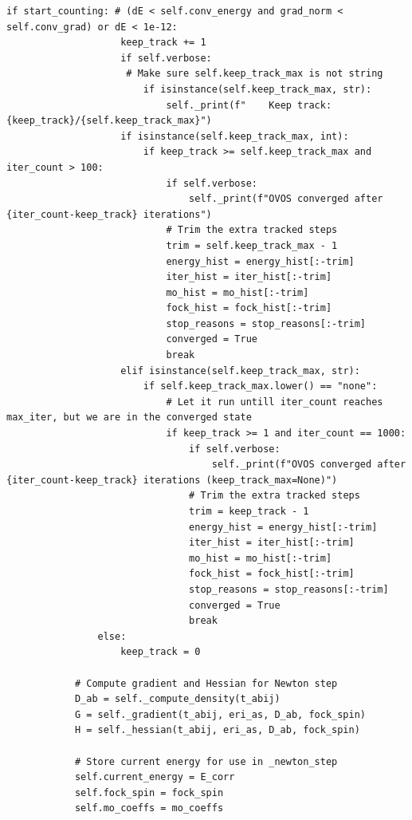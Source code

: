 \begin{lstlisting}[style=python, caption={...}, label=lst:full_code]
                if start_counting: # (dE < self.conv_energy and grad_norm < self.conv_grad) or dE < 1e-12:
                    keep_track += 1
                    if self.verbose:
                     # Make sure self.keep_track_max is not string
                        if isinstance(self.keep_track_max, str):
                            self._print(f"    Keep track: {keep_track}/{self.keep_track_max}")
                    if isinstance(self.keep_track_max, int):
                        if keep_track >= self.keep_track_max and iter_count > 100:
                            if self.verbose:
                                self._print(f"OVOS converged after {iter_count-keep_track} iterations")
                            # Trim the extra tracked steps
                            trim = self.keep_track_max - 1
                            energy_hist = energy_hist[:-trim]
                            iter_hist = iter_hist[:-trim]
                            mo_hist = mo_hist[:-trim]
                            fock_hist = fock_hist[:-trim]
                            stop_reasons = stop_reasons[:-trim]
                            converged = True
                            break
                    elif isinstance(self.keep_track_max, str):
                        if self.keep_track_max.lower() == "none":
                            # Let it run untill iter_count reaches max_iter, but we are in the converged state
                            if keep_track >= 1 and iter_count == 1000:
                                if self.verbose:
                                    self._print(f"OVOS converged after {iter_count-keep_track} iterations (keep_track_max=None)")
                                # Trim the extra tracked steps
                                trim = keep_track - 1
                                energy_hist = energy_hist[:-trim]
                                iter_hist = iter_hist[:-trim]
                                mo_hist = mo_hist[:-trim]
                                fock_hist = fock_hist[:-trim]
                                stop_reasons = stop_reasons[:-trim]
                                converged = True
                                break
                else:
                    keep_track = 0

            # Compute gradient and Hessian for Newton step
            D_ab = self._compute_density(t_abij)
            G = self._gradient(t_abij, eri_as, D_ab, fock_spin)
            H = self._hessian(t_abij, eri_as, D_ab, fock_spin)

            # Store current energy for use in _newton_step
            self.current_energy = E_corr
            self.fock_spin = fock_spin
            self.mo_coeffs = mo_coeffs


\end{lstlisting}
